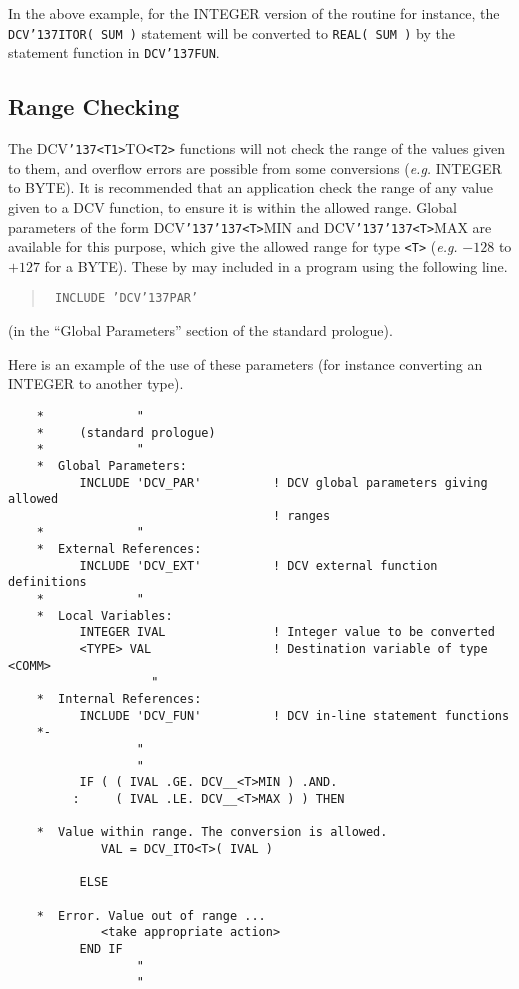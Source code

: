 \documentclass[twoside,11pt]{article}
\renewcommand{\_}{{\tt\char'137}}     %
\begin{document}
In the above example, for the INTEGER version of the routine for
instance, the {\tt DCV\_ITOR(~SUM~)} statement will be converted to
{\tt REAL(~SUM~)} by the statement function in {\tt DCV\_FUN}.

\subsection{Range Checking}

The DCV\_\verb+<T1>+TO\verb+<T2>+ functions will not check the range of the
values given to them, and overflow errors are possible from some conversions
(\emph{e.g.} INTEGER to BYTE).
It is recommended that an application check the range of any value
given to a DCV function, to ensure it is within the allowed range.
Global parameters of the form DCV\_\_\verb+<T>+MIN and DCV\_\_\verb+<T>+MAX
are available for this purpose, which give the allowed range for type
\verb+<T>+ (\emph{e.g.} $-128$ to $+127$ for a BYTE).
These by may included in a program using the following line.

\begin{quote}{\tt
INCLUDE 'DCV\_PAR'
}
\end{quote}

(in the ``Global Parameters'' section of the standard prologue).

Here is an example of the use of these parameters (for instance
converting an INTEGER to another type).

\begin{verbatim}
    *             "
    *     (standard prologue)
    *             "
    *  Global Parameters:
          INCLUDE 'DCV_PAR'          ! DCV global parameters giving allowed
                                     ! ranges
    *             "
    *  External References:
          INCLUDE 'DCV_EXT'          ! DCV external function definitions
    *             "
    *  Local Variables:
          INTEGER IVAL               ! Integer value to be converted
          <TYPE> VAL                 ! Destination variable of type <COMM>
                    "
    *  Internal References:
          INCLUDE 'DCV_FUN'          ! DCV in-line statement functions
    *-
                  "
                  "
          IF ( ( IVAL .GE. DCV__<T>MIN ) .AND.
         :     ( IVAL .LE. DCV__<T>MAX ) ) THEN

    *  Value within range. The conversion is allowed.
             VAL = DCV_ITO<T>( IVAL )

          ELSE

    *  Error. Value out of range ...
             <take appropriate action>
          END IF
                  "
                  "
\end{verbatim}
\end{document}
